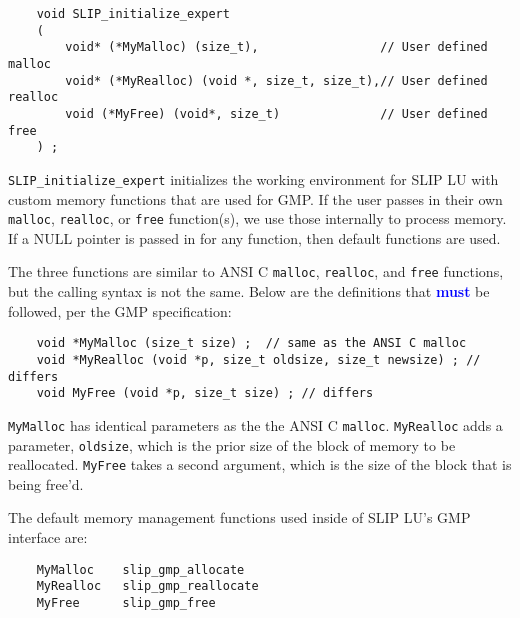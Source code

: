 \documentclass[12pt]{article}
\theoremstyle{definition}
\begin{document}
\begin{mdframed}[userdefinedwidth=6in]
{\footnotesize
\begin{verbatim}
    void SLIP_initialize_expert
    (
        void* (*MyMalloc) (size_t),                 // User defined malloc
        void* (*MyRealloc) (void *, size_t, size_t),// User defined realloc
        void (*MyFree) (void*, size_t)              // User defined free
    ) ;
\end{verbatim}
} \end{mdframed}

\verb|SLIP_initialize_expert| initializes the working environment for SLIP LU
with custom memory functions that are used for GMP. If the user passes in their
own \verb|malloc|, \verb|realloc|, or \verb|free| function(s), we use those
internally to process memory. If a NULL pointer is passed in for any function,
then default functions are used.

The three functions are similar to ANSI C \verb|malloc|, \verb|realloc|, and
\verb|free| functions, but the calling syntax is not the same.  Below are the
definitions that \textcolor{blue}{\textbf{must}} be followed, per the GMP
specification:

\begin{mdframed}[userdefinedwidth=6in]
{\footnotesize
\begin{verbatim}
    void *MyMalloc (size_t size) ;  // same as the ANSI C malloc
    void *MyRealloc (void *p, size_t oldsize, size_t newsize) ; // differs
    void MyFree (void *p, size_t size) ; // differs
\end{verbatim}
} \end{mdframed}

\verb|MyMalloc| has identical parameters as the the ANSI C \verb|malloc|.
\verb|MyRealloc| adds a parameter, \verb|oldsize|, which is the prior size of
the block of memory to be reallocated.  \verb|MyFree| takes a second argument,
which is the size of the block that is being free'd.

The default memory management functions used inside of SLIP LU's GMP interface
are:

\begin{mdframed}[userdefinedwidth=6in]
{\footnotesize
\begin{verbatim}
    MyMalloc    slip_gmp_allocate
    MyRealloc   slip_gmp_reallocate
    MyFree      slip_gmp_free
\end{verbatim}
} \end{mdframed}
\end{document}

